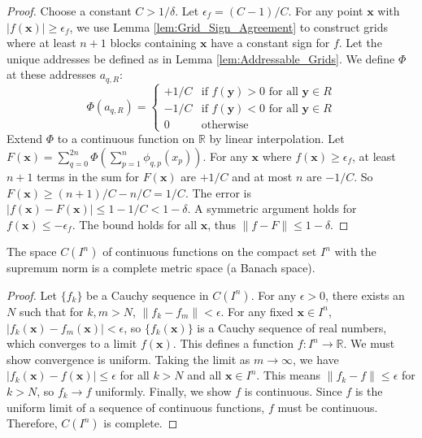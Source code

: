 \begin{proof}
    Choose a constant $C > 1/\delta$. Let $\epsilon_f = (C-1)/C$. For any point $\mathbf{x}$ with $|f(\mathbf{x})| \ge \epsilon_f$, we use Lemma \ref{lem:Grid_Sign_Agreement} to construct grids where at least $n+1$ blocks containing $\mathbf{x}$ have a constant sign for $f$. Let the unique addresses be defined as in Lemma \ref{lem:Addressable_Grids}. We define $\Phi$ at these addresses $a_{q,R}$:
    \[ \Phi(a_{q,R}) = \begin{cases} +1/C & \text{if } f(\mathbf{y}) > 0 \text{ for all } \mathbf{y} \in R \\ -1/C & \text{if } f(\mathbf{y}) < 0 \text{ for all } \mathbf{y} \in R \\ 0 & \text{otherwise} \end{cases} \]
    Extend $\Phi$ to a continuous function on $\mathbb{R}$ by linear interpolation. Let $F(\mathbf{x}) = \sum_{q=0}^{2n} \Phi\left(\sum_{p=1}^n \phi_{q,p}(x_p)\right)$. For any $\mathbf{x}$ where $f(\mathbf{x}) \ge \epsilon_f$, at least $n+1$ terms in the sum for $F(\mathbf{x})$ are $+1/C$ and at most $n$ are $-1/C$. So $F(\mathbf{x}) \ge (n+1)/C - n/C = 1/C$. The error is $|f(\mathbf{x}) - F(\mathbf{x})| \le 1 - 1/C < 1 - \delta$. A symmetric argument holds for $f(\mathbf{x}) \le -\epsilon_f$. The bound holds for all $\mathbf{x}$, thus $\|f - F\| \le 1 - \delta$.
\end{proof}

\begin{lemma}
    \label{lem:Banach_Space_of_Continuous_Functions}
    The space $C(I^n)$ of continuous functions on the compact set $I^n$ with the supremum norm is a complete metric space (a Banach space).
\end{lemma}

\begin{proof}
    Let $\{f_k\}$ be a Cauchy sequence in $C(I^n)$. For any $\epsilon > 0$, there exists an $N$ such that for $k,m > N$, $\|f_k - f_m\| < \epsilon$. For any fixed $\mathbf{x} \in I^n$, $|f_k(\mathbf{x}) - f_m(\mathbf{x})| < \epsilon$, so $\{f_k(\mathbf{x})\}$ is a Cauchy sequence of real numbers, which converges to a limit $f(\mathbf{x})$. This defines a function $f: I^n \to \mathbb{R}$.
    We must show convergence is uniform. Taking the limit as $m \to \infty$, we have $|f_k(\mathbf{x}) - f(\mathbf{x})| \le \epsilon$ for all $k>N$ and all $\mathbf{x} \in I^n$. This means $\|f_k - f\| \le \epsilon$ for $k>N$, so $f_k \to f$ uniformly.
    Finally, we show $f$ is continuous. Since $f$ is the uniform limit of a sequence of continuous functions, $f$ must be continuous. Therefore, $C(I^n)$ is complete.
\end{proof}

